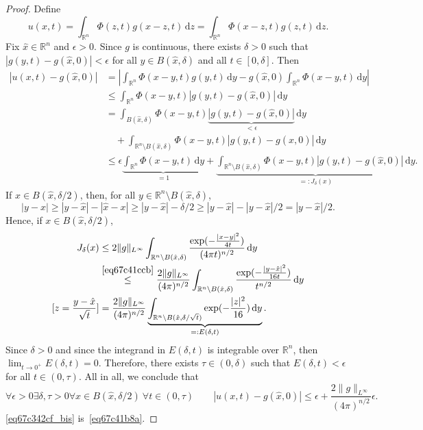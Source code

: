 \documentclass[a4paper,9pt]{amsart}
\newcommand{\R}{\mathbb{R}}	%
\newcommand{\did}{\,\mathrm{d}}	%
\theoremstyle{plain}
\theoremstyle{definition}
\theoremstyle{remark}
\begin{document}
\begin{proof}
	Define
	\begin{equation}
		u(x,t) = \int_{\R^n} \Phi(z,t) g(x - z,t) \did z 
		= \int_{\R^n} \Phi(x-z,t) g(z,t) \did z  .
	\end{equation}
	Fix $\hat x\in\R^n$ and $\epsilon>0$.
	Since $g$ is continuous, there exists $\delta>0$ such that $|g(y,t)-g(\hat x,0)|<\epsilon$ for all $y\in B(\hat x,\delta)$ and all $t\in[0,\delta]$.
	Then
	\begin{align*}
	 	|u(x,t)-g(\hat x,0)|
		&= \left| \int_{\R^n} \Phi(x-y,t) g(y,t) \did y - g(\hat x,0) \int_{\R^n} \Phi(x-y,t)\did y \right| \\
		&\le \int_{\R^n} \Phi(x-y,t) |g(y,t)-g(\hat x,0)| \did y \\
		&= \int_{B(\hat x,\delta)} \Phi(x-y,t) \underbrace{|g(y,t)-g(\hat x,0)|}_{<\epsilon} \did y \\
		&\quad + \int_{\R^n\setminus B(\hat x,\delta)} \Phi(x-y,t) |g(y,t)-g(\hat x,0)| \did y \\
		&\le \epsilon \underbrace{\int_{\R^n} \Phi(x-y,t) \did y}_{=1}
			+ \underbrace{ \int_{\R^n\setminus B(\hat x,\delta)} \Phi(x-y,t) |g(y,t)-g(\hat x,0)| \did y }_{=: J_\delta(x)} .
	\end{align*}
	If $x\in B(\hat x,\delta/2)$, then, for all $y\in \R^n\setminus B(\hat x,\delta)$,
	\begin{equation}\label{eq67c41ccb}
		|y-x| 
		\ge |y-\hat x|-|\hat x-x|
		\ge |y-\hat x|-\delta/2
		\ge |y-\hat x| - |y-\hat x|/2
		= |y-\hat x|/2 .
	\end{equation}
	Hence, if $x\in B(\hat x,\delta/2)$, 
	\begin{align*}
	 	J_\delta(x) 
		&\le 2 \|g\|_{L^\infty} \int_{\R^n\setminus B(\hat x,\delta)} \frac{ \exp(-\frac{|x-y|^2}{4t} ) }{ (4\pi t)^{n/2} } \did y \\
		&\overset{\eqref{eq67c41ccb}}\le \frac{2 \|g\|_{L^\infty}}{(4\pi)^{n/2}}
			\int_{\R^n\setminus B(\hat x,\delta)} \frac{ \exp(-\frac{|y-\hat x|^2}{16t} ) }{  t^{n/2} } \did y \\
		[z = \frac{y-\hat x}{\sqrt{t}}]
		&= \frac{2 \|g\|_{L^\infty}}{(4\pi)^{n/2}} 
			\underbrace{\int_{\R^n\setminus B(\hat x,\delta/\sqrt{t})} \exp(-\frac{|z|^2}{16} ) \did y }_{=:E(\delta,t)} .
	\end{align*}
	Since $\delta>0$ and since the integrand in $E(\delta,t)$ is integrable over $\R^n$, then $\lim_{t\to0^+}E(\delta,t) = 0$.
	Therefore, there exists $\tau\in(0,\delta)$ such that $E(\delta,t)<\epsilon$ for all $t\in(0,\tau)$.
	All in all, we conclude that
	\begin{equation}\label{eq67c342cf_bis}
		\forall\epsilon>0\exists \delta,\tau>0 \forall x\in B(\hat x,\delta/2)\ \forall t\in(0,\tau)
		\qquad
		|u(x,t) - g(\hat x,0)| \le \epsilon + \frac{2 \|g\|_{L^\infty}}{(4\pi)^{n/2}} \epsilon .
	\end{equation}
	\eqref{eq67c342cf_bis} is~\eqref{eq67c41b8a}.
\end{proof}
\end{document}
